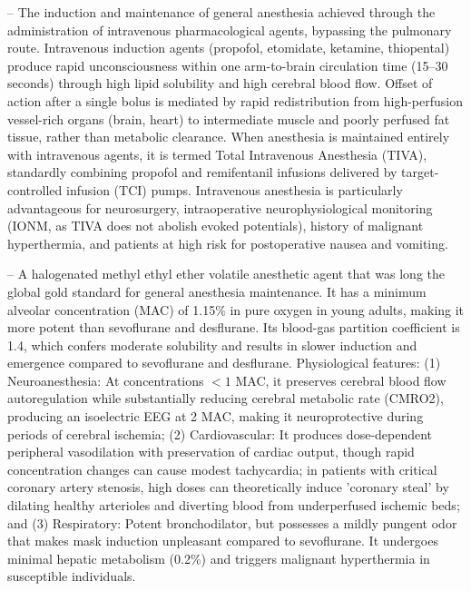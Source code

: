 -- The induction and maintenance of general anesthesia achieved through the administration of intravenous pharmacological agents, bypassing the pulmonary route. Intravenous induction agents (propofol, etomidate, ketamine, thiopental) produce rapid unconsciousness within one arm-to-brain circulation time (15--30 seconds) through high lipid solubility and high cerebral blood flow. Offset of action after a single bolus is mediated by rapid redistribution from high-perfusion vessel-rich organs (brain, heart) to intermediate muscle and poorly perfused fat tissue, rather than metabolic clearance. When anesthesia is maintained entirely with intravenous agents, it is termed Total Intravenous Anesthesia (TIVA), standardly combining propofol and remifentanil infusions delivered by target-controlled infusion (TCI) pumps. Intravenous anesthesia is particularly advantageous for neurosurgery, intraoperative neurophysiological monitoring (IONM, as TIVA does not abolish evoked potentials), history of malignant hyperthermia, and patients at high risk for postoperative nausea and vomiting.

-- A halogenated methyl ethyl ether volatile anesthetic agent that was long the global gold standard for general anesthesia maintenance. It has a minimum alveolar concentration (MAC) of 1.15\% in pure oxygen in young adults, making it more potent than sevoflurane and desflurane. Its blood-gas partition coefficient is 1.4, which confers moderate solubility and results in slower induction and emergence compared to sevoflurane and desflurane. Physiological features: (1) Neuroanesthesia: At concentrations $<1$ MAC, it preserves cerebral blood flow autoregulation while substantially reducing cerebral metabolic rate (CMRO2), producing an isoelectric EEG at 2 MAC, making it neuroprotective during periods of cerebral ischemia; (2) Cardiovascular: It produces dose-dependent peripheral vasodilation with preservation of cardiac output, though rapid concentration changes can cause modest tachycardia; in patients with critical coronary artery stenosis, high doses can theoretically induce 'coronary steal' by dilating healthy arterioles and diverting blood from underperfused ischemic beds; and (3) Respiratory: Potent bronchodilator, but possesses a mildly pungent odor that makes mask induction unpleasant compared to sevoflurane. It undergoes minimal hepatic metabolism (0.2\%) and triggers malignant hyperthermia in susceptible individuals.

